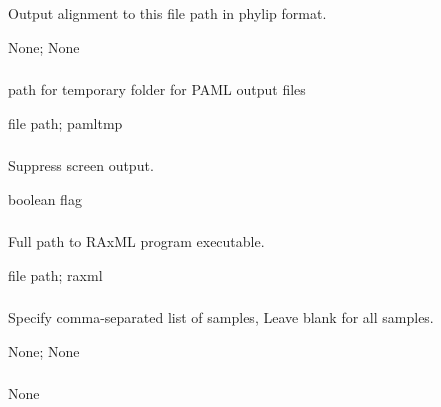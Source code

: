 \documentclass[letterpaper,11pt,english]{sphinxmanual}
\begin{document}
\subsubsection{}
\label{\detokenize{prog_desc:output-align-outputalign}}
 Output alignment to this file path in phylip format.

 None;  None


\subsubsection{}
\label{\detokenize{prog_desc:pamltmp-paml-tmp}}
 path for temporary folder for PAML output files

 file path;  pamltmp


\subsubsection{}
\label{\detokenize{prog_desc:id97}}
 Suppress screen output.

 boolean flag


\subsubsection{}
\label{\detokenize{prog_desc:raxml-path-raxmlpath}}
 Full path to RAxML program executable.

 file path;  raxml


\subsubsection{}
\label{\detokenize{prog_desc:id98}}
 Specify comma-separated list of samples, Leave blank for all samples.

 None;  None


\subsubsection{}
\label{\detokenize{prog_desc:species-groups-speciesgroups}}
 None
\end{document}
